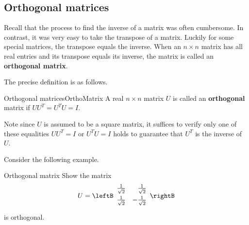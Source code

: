 \subsection{Orthogonal matrices}

Recall that the process to find the inverse of a matrix was often cumbersome. 
In contrast, it was very easy to take the transpose of a matrix. Luckily for some special
matrices, the transpose equals the inverse. When an $n \times n$ matrix has all real
entries and its transpose equals its inverse, the matrix is called an \textbf{orthogonal matrix}. 

The precise definition is as follows. 

\begin{definition}{Orthogonal matrices}{OrthoMatrix}
A real $n\times n$ matrix $U$ is called an
 \textbf{orthogonal} matrix if $UU^{T}=U^{T}U=I.$
\end{definition}

Note since $U$ is assumed to be a square matrix, it suffices to verify
only one of these equalities $UU^{T}=I$ or $U^{T}U=I$ holds to
guarantee that $U^T$ is the inverse of $U$.

Consider the following example. 

\begin{example}{Orthogonal matrix}{}
Show the matrix
\begin{equation*}
U=\leftB
\begin{array}{rr}
\vspace{0.05in}\frac{1}{\sqrt{2}} & \frac{1}{\sqrt{2}} \\
\vspace{0.05in}\frac{1}{\sqrt{2}} & -\frac{1}{\sqrt{2}}
\end{array}
\rightB
\end{equation*}
is orthogonal.
\end{example}

